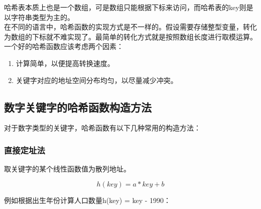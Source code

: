 哈希表本质上也是一个数组，可是数组只能根据下标来访问，而哈希表的key则是以字符串类型为主的。 \\

在不同的语言中，哈希函数的实现方式是不一样的。假设需要存储整型变量，转化为数组的下标就不难实现了。最简单的转化方式就是按照数组长度进行取模运算。 \\

一个好的哈希函数应该考虑两个因素：

\begin{enumerate}
	\item 计算简单，以便提高转换速度。
	\item 关键字对应的地址空间分布均匀，以尽量减少冲突。
\end{enumerate}

\subsection{数字关键字的哈希函数构造方法}

对于数字类型的关键字，哈希函数有以下几种常用的构造方法：

\subsubsection{直接定址法}

取关键字的某个线性函数值为散列地址。

\vspace{-0.5cm}

$$
	h(key) = a * key + b
$$

例如根据出生年份计算人口数量h(key) = key - 1990：

\begin{table}[H]
	\centering
	\caption{直接定址法}
\end{table}

